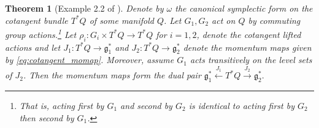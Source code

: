 \documentclass[12pt]{amsart}
\newtheorem{thm}{Theorem}[section]
\begin{document}
  \begin{thm}[Example 2.2 of \cite{GayBalmazVizman2012}] \label{thm:commuting_actions}
    Denote by $\omega$ the canonical symplectic form on the cotangent bundle $T^*Q$ of some manifold $Q$.
    Let $G_1,G_2$ act on $Q$
    by commuting group actions.\footnote{That is, acting first by $G_1$ and second by $G_2$ is identical to acting first by $G_2$ then second by $G_1$.}
    Let
    $\rho_i: G_i \times T^*Q \to T^*Q$ for $i=1,2$, denote the cotangent lifted actions
    and let $J_1: T^*Q \to \mathfrak{g}_1^*$ and $J_2: T^*Q \to \mathfrak{g}_2^*$ denote the momentum maps given by \eqref{eq:cotangent_momap}. 
    Moreover, assume $G_1$ acts transitively on the level sets of $J_2$.
    Then the momentum maps form the dual pair
    $
      \mathfrak{g}^*_1
      \stackrel{J_1}{\longleftarrow}
      T^*Q
      \stackrel{J_2}{\longrightarrow}
      \mathfrak{g}_2^*.
    $
  \end{thm}
\end{document}
